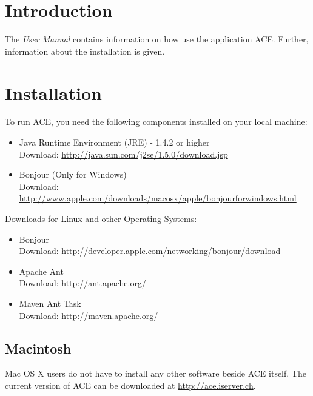 \documentclass[11pt,a4paper]{article}
\begin{document}
\setlength{\parindent}{0pt}



\tableofcontents






\newpage
\section{Introduction}

The \emph{User Manual} contains information on how use the application ACE. Further, information about the installation is given.






\section{Installation}
To run ACE, you need the following components installed on your local machine:
\begin{itemize}
 \item Java Runtime Environment (JRE) - 1.4.2 or higher \\
 Download: \href{http://java.sun.com/j2se/1.5.0/download.jsp}{http://java.sun.com/j2se/1.5.0/download.jsp}
 \item Bonjour (Only for Windows) \\
 Download: \href{http://www.apple.com/downloads/macosx/apple/bonjourforwindows.html}{http://www.apple.com/downloads/macosx/apple/bonjourforwindows.html}
\end{itemize}

Downloads for Linux and other Operating Systems:

\begin{itemize}
 \item Bonjour \\
 Download: \href{http://developer.apple.com/networking/bonjour/download}{http://developer.apple.com/networking/bonjour/download}
 \item Apache Ant \\
 Download: \href{http://ant.apache.org/}{http://ant.apache.org/}
 \item Maven Ant Task \\
 Download: \href{http://maven.apache.org/}{http://maven.apache.org/}
\end{itemize}

\subsection{Macintosh}
Mac OS X users do not have to install any other software beside ACE itself. The current version of ACE can be downloaded at \href{http://ace.iserver.ch}{http://ace.iserver.ch}.
\end{document}
